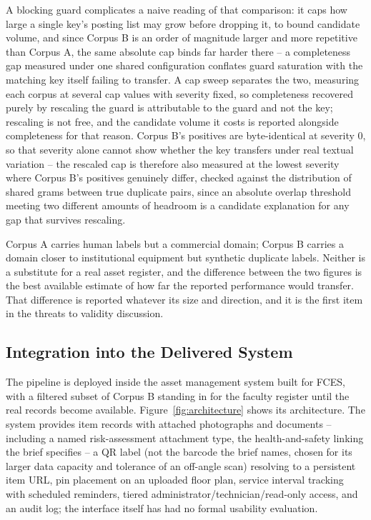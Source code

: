 \documentclass[conference]{IEEEtran}
\begin{document}
A blocking guard complicates a naive reading of that comparison: it
caps how large a single key's posting list may grow before dropping
it, to bound candidate volume, and since Corpus B is an order of
magnitude larger and more repetitive than Corpus A, the same absolute
cap binds far harder there -- a completeness gap measured under one
shared configuration conflates guard saturation with the matching key
itself failing to transfer. A cap sweep separates the two, measuring
each corpus at several cap values with severity fixed, so completeness
recovered purely by rescaling the guard is attributable to the guard
and not the key; rescaling is not free, and the candidate volume it
costs is reported alongside completeness for that reason. Corpus B's
positives are byte-identical at severity 0, so that severity alone
cannot show whether the key transfers under real textual variation --
the rescaled cap is therefore also measured at the lowest severity
where Corpus B's positives genuinely differ, checked against the
distribution of shared grams between true duplicate pairs, since an
absolute overlap threshold meeting two different amounts of headroom
is a candidate explanation for any gap that survives rescaling.

Corpus A carries human labels but a commercial domain; Corpus B carries
a domain closer to institutional equipment but synthetic duplicate
labels. Neither is a substitute for a real asset register, and the
difference between the two figures is the best available estimate of
how far the reported performance would transfer. That difference is
reported whatever its size and direction, and it is the first item in
the threats to validity discussion.

\subsection{Integration into the Delivered System}

The pipeline is deployed inside the asset management system built for
FCES, with a filtered subset of Corpus B standing in for the faculty
register until the real records become available. Figure~\ref{fig:architecture}
shows its architecture. The system provides item records with attached
photographs and documents -- including a named risk-assessment
attachment type, the health-and-safety linking the brief specifies --
a QR label (not the barcode the brief names, chosen for its larger
data capacity and tolerance of an off-angle scan) resolving to a
persistent item URL, pin placement on an uploaded floor plan, service
interval tracking with scheduled reminders, tiered
administrator/technician/read-only access, and an audit log; the
interface itself has had no formal usability evaluation.
\end{document}
